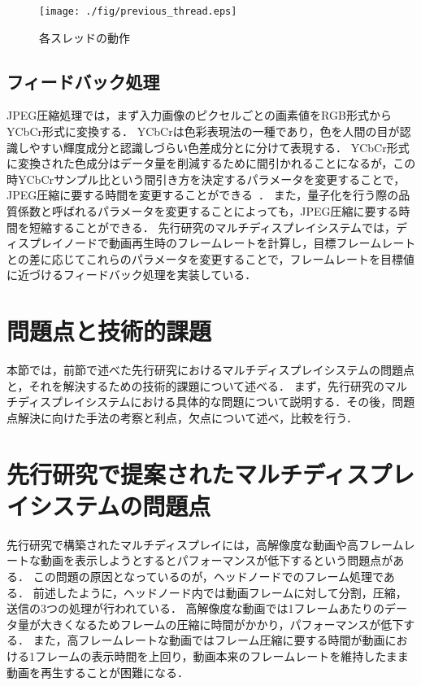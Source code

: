   \begin{center}
    \begin{figure}[H]
        \hspace*{\fill}
        \texttt{[image: ./fig/previous\_thread.eps]}
        \hspace*{\fill}
        \caption{各スレッドの動作}
    \end{figure}
    \end{center}
   

\subsection*{フィードバック処理}

JPEG圧縮処理では，まず入力画像のピクセルごとの画素値をRGB形式からYCbCr形式に変換する．
YCbCrは色彩表現法の一種であり，色を人間の目が認識しやすい輝度成分と認識しづらい色差成分とに分けて表現する\cite{YCbCr}．
YCbCr形式に変換された色成分はデータ量を削減するために間引かれることになるが，この時YCbCrサンプル比という間引き方を決定するパラメータを変更することで，
JPEG圧縮に要する時間を変更することができる~\cite{jpeg2}．
また，量子化を行う際の品質係数と呼ばれるパラメータを変更することによっても，JPEG圧縮に要する時間を短縮することができる．
先行研究のマルチディスプレイシステムでは，ディスプレイノードで動画再生時のフレームレートを計算し，目標フレームレートとの差に応じてこれらのパラメータを変更することで，フレームレートを目標値に近づけるフィードバック処理を実装している．





\section*{問題点と技術的課題}

本節では，前節で述べた先行研究におけるマルチディスプレイシステムの問題点と，それを解決するための技術的課題について述べる．
まず，先行研究のマルチディスプレイシステムにおける具体的な問題について説明する．その後，問題点解決に向けた手法の考察と利点，欠点について述べ，比較を行う．

\section*{先行研究で提案されたマルチディスプレイシステムの問題点}
先行研究で構築されたマルチディスプレイには，高解像度な動画や高フレームレートな動画を表示しようとするとパフォーマンスが低下するという問題点がある．
この問題の原因となっているのが，ヘッドノードでのフレーム処理である．
前述したように，ヘッドノード内では動画フレームに対して分割，圧縮，送信の3つの処理が行われている．
高解像度な動画では1フレームあたりのデータ量が大きくなるためフレームの圧縮に時間がかかり，パフォーマンスが低下する．
また，高フレームレートな動画ではフレーム圧縮に要する時間が動画における1フレームの表示時間を上回り，動画本来のフレームレートを維持したまま動画を再生することが困難になる．

